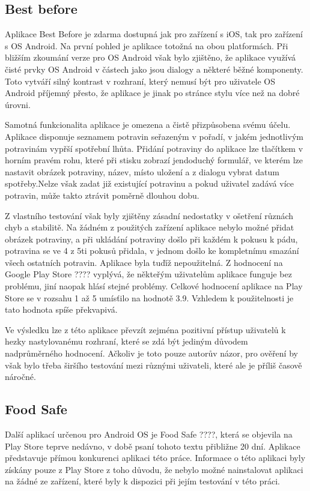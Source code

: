 \documentclass[thesis=B,czech]{FITthesis}[2013/10/20]
\begin{document}
\subsection{Best before}

Aplikace Best Before je zdarma dostupná jak pro zařízení s iOS, tak pro zařízení s OS Android. Na první pohled je aplikace totožná na obou platformách. Při bližším zkoumání verze pro OS Android však bylo zjištěno, že aplikace využívá čisté prvky OS Android v částech jako jsou dialogy a některé běžné komponenty. Toto vytváří silný kontrast v rozhraní, který nemusí být pro uživatele OS Android příjemný přesto, že aplikace je jinak po stránce stylu více než na dobré úrovni.

Samotná funkcionalita aplikace je omezena a čistě přizpůsobena svému účelu. Aplikace disponuje seznamem potravin seřazeným v pořadí, v jakém jednotlivým potravinám vypřší spotřební lhůta. Přidání potraviny do aplikace lze tlačítkem v horním pravém rohu, které při stisku zobrazí jendoduchý formulář, ve kterém lze nastavit obrázek potraviny, název, místo uložení a z dialogu vybrat datum spotřeby.Nelze však zadat již existující potravinu a pokud uživatel zadává více potravin, může takto ztrávit poměrně dlouhou dobu.

Z vlastního testování však byly zjištěny zásadní nedostatky v ošetření různách chyb a stabilitě. Na žádném z použitých zařízení aplikace nebylo možné přidat obrázek potraviny, a při ukládání potraviny došlo při každém k pokusu k pádu, potravina se ve 4 z 5ti pokusů přidala, v jednom došlo ke kompletnímu smazání všech ostatních potravin. Aplikace byla tuďíž nepoužitelná. Z hodnocení na Google Play Store ???? vyplývá, že někteřým uživatelům aplikace funguje bez problému, jiní naopak hlásí stejné problémy. Celkové hodnocení aplikace na Play Store se v rozsahu 1 až 5 umísťilo na hodnotě 3.9. Vzhledem k použitelnosti je tato hodnota spíše překvapivá.

Ve výsledku lze z této aplikace převzít zejména pozitivní přístup uživatelů k hezky nastylovanému rozhraní, které se zdá být jediným důvodem nadprůměrného hodnocení. Ačkoliv je toto pouze autorův názor, pro ověření by však bylo třeba širšího testování mezi různými uživateli, které ale je příliš časově náročné.

\subsection{Food Safe}

Další aplikací určenou pro Android OS je Food Safe ????, která se objevila na Play Store teprve nedávno, v době psaní tohoto textu přibližne 20 dní. Aplikace představuje přímou konkurenci aplikaci této práce. Informace o této aplikaci byly získány pouze z Play Store z toho důvodu, že nebylo možné nainstalovat aplikaci na žádné ze zařízení, které byly k dispozici při jejím testování v této práci. 
\end{document}
